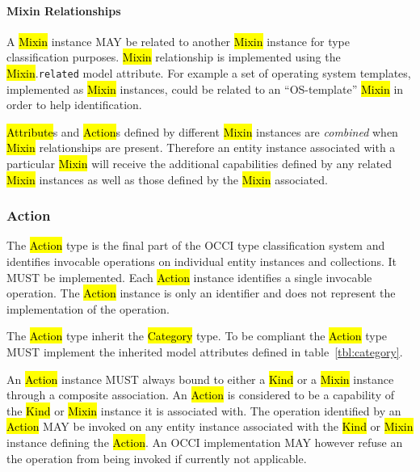 \documentclass[10pt,a4paper]{article}
\begin{document}
\paragraph*{Mixin Relationships}

A \hl{Mixin} instance MAY be related to another \hl{Mixin} instance
for type classification purposes.
\hl{Mixin} relationship is implemented using the \hl{Mixin}.{\tt related}
model attribute.
For example a set of operating
system templates, implemented as \hl{Mixin} instances, could be
related to an ``OS-template'' \hl{Mixin} in order to help
identification.

\hl{Attribute}s and \hl{Action}s defined by different \hl{Mixin} instances
are {\em combined} when \hl{Mixin} relationships are present. Therefore an
entity instance associated with a particular \hl{Mixin} will receive
the additional capabilities defined by any related \hl{Mixin}
instances as well as those defined by the \hl{Mixin} associated.


\subsubsection{Action}
The \hl{Action} type is the final part of the OCCI type classification system
and identifies invocable operations on individual entity instances and collections.
It MUST be implemented.
Each \hl{Action} instance identifies a single invocable operation.
The \hl{Action} instance is only an identifier and does not represent the
implementation of the operation.

The \hl{Action} type inherit the \hl{Category} type. To be compliant
the \hl{Action} type MUST implement the inherited model attributes defined in
table~\ref{tbl:category}.


An \hl{Action} instance MUST always bound to either a \hl{Kind} or a \hl{Mixin}
instance through a composite association. An \hl{Action} is considered
to be a capability of the \hl{Kind} or \hl{Mixin} instance it is
associated with.  The operation identified by an \hl{Action} MAY be invoked on
any entity
instance associated with the \hl{Kind} or \hl{Mixin} instance defining
the \hl{Action}. An OCCI implementation MAY however refuse an
the operation from being invoked if currently not applicable.
\end{document}
